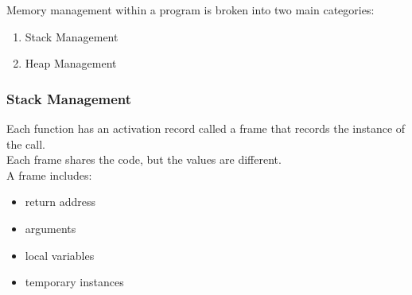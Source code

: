 \documentclass[../../lecture_notes.tex]{subfiles}
\begin{document}
Memory management within a program is broken into two main categories:
\begin{enumerate} [itemsep=0mm]
	\item Stack Management
	\item Heap Management
\end{enumerate}

\subsubsection*{Stack Management}
Each function has an activation record called a frame that records the instance of the call.\\
Each frame shares the code, but the values are different.\\
A frame includes:
	\begin{itemize} [itemsep=0mm]
		\item return address
		\item arguments
		\item local variables
		\item temporary instances
	\end{itemize}
\end{document}

